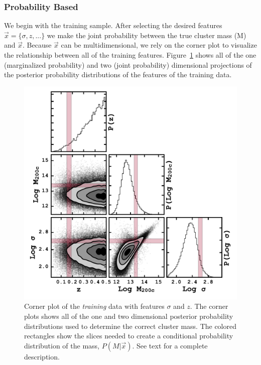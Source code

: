 \documentclass[fleqn,usenatbib]{mnras}
\begin{document}
\subsubsection{Probability Based}\label{sec:probability method}
We begin with the training sample. After selecting the desired features $\vec{x} = \{\sigma, z, ...\}$ we make the joint probability between the true cluster mass (M) and $\vec{x}$. Because $\vec{x}$ can be multidimensional, we rely on the corner plot to visualize the relationship between all of the training features. Figure~\ref{fig: probability corner} shows all of the one (marginalized probability) and two (joint probability) dimensional projections of the posterior probability distributions of the features of the training data.

\begin{figure} 
	\includegraphics[width=\columnwidth]{figures/cornertest.pdf} 
	\caption{Corner plot of the \emph{training} data with features $\sigma$ and $z$. The corner plots shows all of the one and two dimensional posterior probability distributions used to determine the correct cluster mass. The colored rectangles show the slices needed to create a conditional probability distribution of the mass, $P(M|\vec{x})$. See text for a complete description. } \label{fig: probability corner} 
\end{figure}
\end{document}
